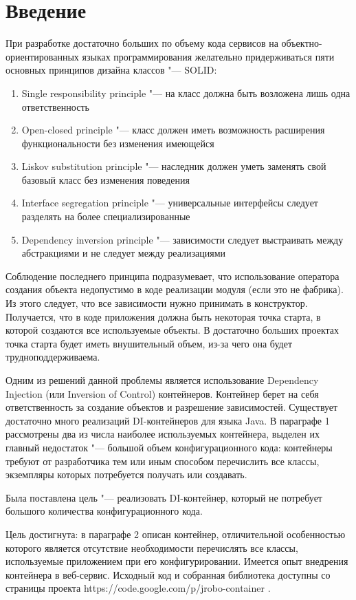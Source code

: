 \section{Введение}

При разработке достаточно больших по объему кода сервисов на объектно-ориентированных языках программирования желательно придерживаться пяти основных принципов дизайна
классов "--- SOLID:

\begin{enumerate}
	\item Single responsibility principle "--- на класс должна быть возложена лишь одна ответственность
	\item Open-closed principle "--- класс должен иметь возможность расширения функциональности без изменения имеющейся
	\item Liskov substitution principle "--- наследник должен уметь заменять свой базовый класс без изменения поведения
	\item Interface segregation principle "--- универсальные интерфейсы следует разделять на более специализированные
	\item Dependency inversion principle "--- зависимости следует выстраивать между абстракциями и не следует между реализациями
\end{enumerate}

Соблюдение последнего принципа подразумевает, что использование оператора создания объекта недопустимо в коде реализации модуля (если это не фабрика). Из этого следует, что все зависимости нужно
принимать в конструктор. Получается, что в коде приложения должна быть некоторая точка старта, в которой создаются все используемые объекты. В достаточно больших проектах точка старта 
будет иметь внушительный объем, из-за чего она будет трудноподдерживаема. 

Одним из решений данной проблемы является использование Dependency Injection (или Inversion of Control) контейнеров.
Контейнер берет на себя ответственность за создание объектов и разрешение зависимостей. Существует достаточно много реализаций DI-контейнеров для языка Java. 
В параграфе 1 рассмотрены два из числа наиболее используемых контейнера, выделен их главный недостаток "--- большой объем конфигурационного кода: контейнеры
требуют от разработчика тем или иным способом перечислить все классы, экземпляры которых потребуется получать или создавать.

Была поставлена цель "--- реализовать DI-контейнер, который не потребует большого количества конфигурационного кода.

Цель достигнута: в параграфе 2 описан контейнер, отличительной особенностью которого является отсутствие необходимости перечислять все классы, используемые
приложением при его конфигурировании. Имеется опыт внедрения контейнера в веб-сервис. Исходный код и собранная библиотека доступны со страницы проекта https://code.google.com/p/jrobo-container .